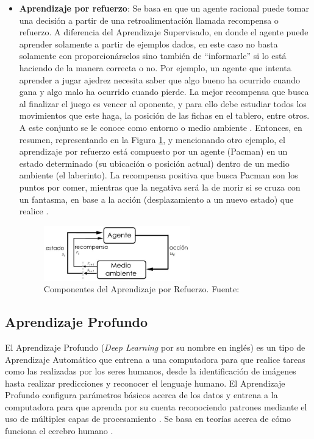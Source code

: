\begin{itemize}
	\item \textbf{Aprendizaje por refuerzo}: Se basa en que un agente racional puede tomar una decisión a partir de una retroalimentación llamada recompensa o refuerzo. A diferencia del Aprendizaje Supervisado, en donde el agente puede aprender solamente a partir de ejemplos dados, en este caso no basta solamente con proporcionárselos sino también de “informarle” si lo está haciendo de la manera correcta o no. Por ejemplo, un agente que intenta aprender a jugar ajedrez necesita saber que algo bueno ha ocurrido cuando gana y algo malo ha ocurrido cuando pierde. La mejor recompensa que busca al finalizar el juego es vencer al oponente, y para ello debe estudiar todos los movimientos que este haga, la posición de las fichas en el tablero, entre otros. A este conjunto se le conoce como entorno o medio ambiente \parencite{bk_russell2004intart}. Entonces, en resumen, representando en la Figura \ref{2:fig4}, y mencionando otro ejemplo, el aprendizaje por refuerzo está compuesto por un agente (Pacman) en un estado determinado (su ubicación o posición actual) dentro de un medio ambiente (el laberinto). La recompensa positiva que busca Pacman son los puntos por comer, mientras que la negativa será la de morir si se cruza con un fantasma, en base a la acción (desplazamiento a un nuevo estado) que realice \parencite{tec_merino2019aprendrefuerzo}.
	\begin{figure}[h]
		\begin{center}
			\includegraphics[width=0.60\textwidth]{2/figures/aprendizaje_refuerzo.jpg}
			\caption[Componentes del Aprendizaje por Refuerzo]{Componentes del Aprendizaje por Refuerzo. Fuente: \cite{bk_sutton2018rl}}
			\label{2:fig4}
		\end{center}
	\end{figure}
\end{itemize}

\clearpage

\subsection{Aprendizaje Profundo}

El Aprendizaje Profundo (\textit{Deep Learning} por su nombre en inglés) es un tipo de Aprendizaje Automático que entrena a una computadora para que realice tareas como las realizadas por los seres humanos, desde la identificación de imágenes hasta realizar predicciones y reconocer el lenguaje humano. El Aprendizaje Profundo configura parámetros básicos acerca de los datos y entrena a la computadora para que aprenda por su cuenta reconociendo patrones mediante el uso de múltiples capas de procesamiento \parencite{gl_sas_deeplearning}. Se basa en teorías acerca de cómo funciona el cerebro humano \parencite{tec_banafa2019deeplearning}.

